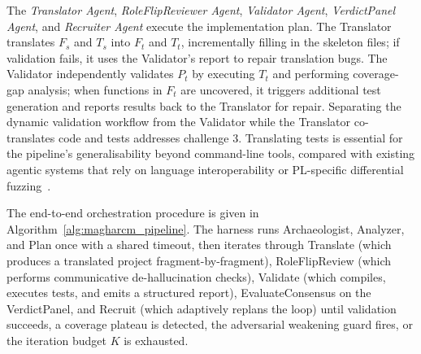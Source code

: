 The \emph{Translator Agent}, \emph{RoleFlipReviewer Agent},
\emph{Validator Agent}, \emph{VerdictPanel Agent}, and \emph{Recruiter
Agent} execute the implementation plan. The Translator translates $F_s$
and $T_s$ into $F_t$ and $T_t$, incrementally filling in the skeleton
files; if validation fails, it uses the Validator's report to repair
translation bugs. The Validator independently validates $P_t$ by
executing $T_t$ and performing coverage-gap analysis; when functions
in $F_t$ are uncovered, it triggers additional test generation and
reports results back to the Translator for repair. Separating the
dynamic validation workflow from the Validator while the Translator
co-translates code and tests addresses challenge 3. Translating tests
is essential for the pipeline's generalisability beyond command-line
tools, compared with existing agentic systems that rely on language
interoperability or PL-specific differential fuzzing~\cite{ibrahimzada2026recodeagent}.

The end-to-end orchestration procedure is given in
Algorithm~\ref{alg:magharcm_pipeline}. The harness runs Archaeologist,
Analyzer, and Plan once with a shared timeout, then iterates through
Translate (which produces a translated project fragment-by-fragment),
RoleFlipReview (which performs communicative de-hallucination
checks), Validate (which compiles, executes tests, and emits a
structured report), EvaluateConsensus on the VerdictPanel, and
Recruit (which adaptively replans the loop) until validation
succeeds, a coverage plateau is detected, the adversarial weakening
guard fires, or the iteration budget $K$ is exhausted.

